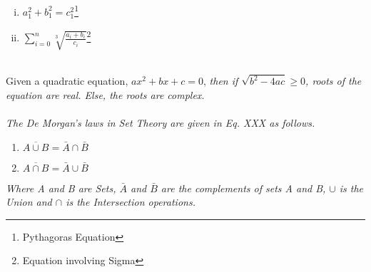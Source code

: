 \documentclass{article}
\begin{document}
\begin{enumerate}[i.]
    \item $a_1^2+b_1^2=c_1^2$\footnote{Pythagoras Equation}
    \item $\sum_{i=0}^{n} \sqrt[3]{\frac{a_i+b_i}{c_i}}$\footnote{Equation involving Sigma}\\\\
\end{enumerate}
Given a quadratic equation, $ax^2+bx+c=0$, \emph{then if $\sqrt{b^2-4ac} \ge 0$, roots of the equation are real. Else, the roots are complex.}\\\\
\emph{The De Morgan's laws in Set Theory are given in Eq. XXX as follows.}
\begin{enumerate}
    \item $\overline{A \cup B} = \bar{A} \cap \bar{B}$
    \item $\overline{A \cap B} = \bar{A} \cup \bar{B}$
\end{enumerate}
\emph{Where A and B are Sets, $\bar{A}$ and $\bar{B}$ are the complements of sets A and B, $\cup$ is the Union and $\cap$ is the Intersection operations.}
\end{document}
